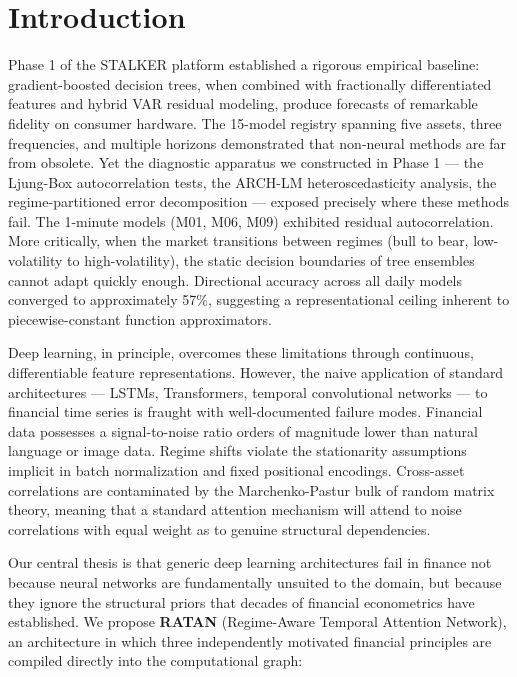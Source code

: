 \documentclass[conference]{IEEEtran}
\begin{document}
\section{Introduction}
\label{sec:intro}

Phase 1 of the STALKER platform established a rigorous empirical baseline: gradient-boosted decision trees, when combined with fractionally differentiated features and hybrid VAR residual modeling, produce forecasts of remarkable fidelity on consumer hardware. The 15-model registry spanning five assets, three frequencies, and multiple horizons demonstrated that non-neural methods are far from obsolete. Yet the diagnostic apparatus we constructed in Phase 1 --- the Ljung-Box autocorrelation tests, the ARCH-LM heteroscedasticity analysis, the regime-partitioned error decomposition --- exposed precisely where these methods fail. The 1-minute models (M01, M06, M09) exhibited residual autocorrelation. More critically, when the market transitions between regimes (bull to bear, low-volatility to high-volatility), the static decision boundaries of tree ensembles cannot adapt quickly enough. Directional accuracy across all daily models converged to approximately 57\%, suggesting a representational ceiling inherent to piecewise-constant function approximators.

Deep learning, in principle, overcomes these limitations through continuous, differentiable feature representations. However, the naive application of standard architectures --- LSTMs, Transformers, temporal convolutional networks --- to financial time series is fraught with well-documented failure modes. Financial data possesses a signal-to-noise ratio orders of magnitude lower than natural language or image data. Regime shifts violate the stationarity assumptions implicit in batch normalization and fixed positional encodings. Cross-asset correlations are contaminated by the Marchenko-Pastur bulk of random matrix theory, meaning that a standard attention mechanism will attend to noise correlations with equal weight as to genuine structural dependencies.

Our central thesis is that generic deep learning architectures fail in finance not because neural networks are fundamentally unsuited to the domain, but because they ignore the structural priors that decades of financial econometrics have established. We propose \textbf{RATAN} (Regime-Aware Temporal Attention Network), an architecture in which three independently motivated financial principles are compiled directly into the computational graph:
\end{document}
